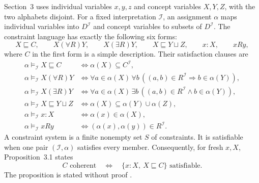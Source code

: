 Section~3 uses individual variables \(x,y,z\) and concept variables \(X,Y,Z\),
with the two alphabets disjoint.  For a fixed interpretation \(\mathcal I\), an
assignment \(\alpha\) maps individual variables into \(D^{\mathcal I}\) and
concept variables to subsets of \(D^{\mathcal I}\).  The constraint language
has exactly the following six forms:
\[
 X\sqsubseteq C,\qquad
 X(\forall R)Y,\qquad
 X(\exists R)Y,\qquad
 X\sqsubseteq Y\sqcup Z,\qquad
 x:X,\qquad
 xRy,
\]
where \(C\) in the first form is a simple description.  Their satisfaction
clauses are
\[
\begin{aligned}
 \alpha\models_{\mathcal I}X\sqsubseteq C
 &\iff \alpha(X)\subseteq C^{\mathcal I},\\
 \alpha\models_{\mathcal I}X(\forall R)Y
 &\iff
   \forall a\in\alpha(X)\,
   \forall b\,((a,b)\in R^{\mathcal I}\Rightarrow b\in\alpha(Y)),\\
 \alpha\models_{\mathcal I}X(\exists R)Y
 &\iff
   \forall a\in\alpha(X)\,
   \exists b\,((a,b)\in R^{\mathcal I}\land b\in\alpha(Y)),\\
 \alpha\models_{\mathcal I}X\sqsubseteq Y\sqcup Z
 &\iff \alpha(X)\subseteq\alpha(Y)\cup\alpha(Z),\\
 \alpha\models_{\mathcal I}x:X
 &\iff \alpha(x)\in\alpha(X),\\
 \alpha\models_{\mathcal I}xRy
 &\iff (\alpha(x),\alpha(y))\in R^{\mathcal I}.
\end{aligned}
\]
A constraint system is a finite nonempty set \(S\) of constraints.  It is
satisfiable when one pair \((\mathcal I,\alpha)\) satisfies every member.
Consequently, for fresh \(x,X\), Proposition~3.1 states
\[
 C\text{ coherent}
 \quad\Longleftrightarrow\quad
 \{x:X,\ X\sqsubseteq C\}\text{ satisfiable}.
\]
The proposition is stated without proof
\cite[\S3, pp.~8--9]{SchmidtSchaussSmolka1991}.

